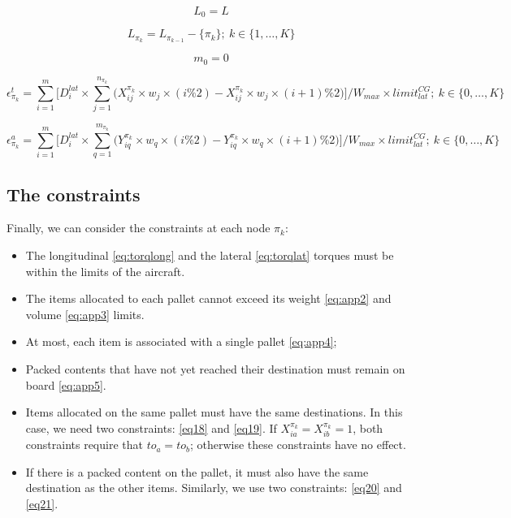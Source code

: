 \documentclass[preprint]{elsarticle}
\begin{document}
\begin{equation} \label{eq:pdp11}
	L_0 = L
\end{equation}

\begin{equation} \label{eq:departing}
	L_{\pi_k} = L_{\pi_{k-1}} - \{\pi_k\}; \ k \in \{1, \ldots, K\}
\end{equation}


	
\begin{equation} \label{eq:pdp13}
	m_0 = 0
\end{equation}


\begin{equation} \label{eq:LatItem}
	\epsilon_{\pi_k}^t = \sum_{i=1}^{m} \Big [ D_i^{lat} \times \sum_{j=1}^{n_{\pi_k}} \Big ( X_{ij}^{\pi_k} \times w_j \times (i\%2) - X_{ij}^{\pi_k} \times w_j \times (i+1)\%2 \Big ) \Big ] \Big / W_{max} \times limit^{CG}_{lat}; \ k \in \{0, \ldots, K\}
\end{equation}

\begin{equation} \label{eq:LatPacked}
	\epsilon_{\pi_k}^a = \sum_{i=1}^{m} \Big [ D_i^{lat} \times \sum_{q=1}^{m_{\pi_k}} \Big ( Y_{iq}^{\pi_k} \times w_q \times (i\%2) - Y_{iq}^{\pi_k} \times w_q \times (i+1)\%2 \Big ) \Big ] \Big / W_{max} \times limit^{CG}_{lat}; \ k \in \{0, \ldots, K\}
\end{equation}



\subsection{The constraints}

Finally, we can consider the constraints at each node $\pi_k$:

\begin{itemize}
	\item The longitudinal \ref{eq:torqlong} and the lateral \ref{eq:torqlat} torques must be within the limits of the aircraft.
	\item The items allocated to each pallet cannot exceed its weight \ref{eq:app2} and volume \ref{eq:app3} limits.
	\item At most, each item is associated with a single pallet \ref{eq:app4};
	\item Packed contents that have not yet reached their destination must remain on board \ref{eq:app5}.
	\item Items allocated on the same pallet must have the same destinations. In this case, we need two constraints: \ref{eq18} and \ref{eq19}. If $X_{ia}^{\pi_k} = X_{ib}^{\pi_k} = 1$, both constraints require that $to_a = to_b$; otherwise these constraints have no effect.
	\item If there is a packed content on the pallet, it must also have the same destination as the other items. Similarly, we use two constraints: \ref{eq20} and \ref{eq21}.
\end{itemize}
\end{document}
